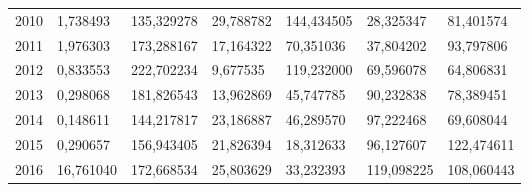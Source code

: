 \begin{table}
\begin{tabular}{p{1cm}p{2cm}p{2cm}p{2cm}p{2cm}p{2cm}p{2cm}}
 2010 &                               1,738493 &        135,329278 &                            29,788782 &                            144,434505 &                    28,325347 &  81,401574 \\
 2011 &                               1,976303 &        173,288167 &                            17,164322 &                             70,351036 &                    37,804202 &  93,797806 \\
 2012 &                               0,833553 &        222,702234 &                             9,677535 &                            119,232000 &                    69,596078 &  64,806831 \\
 2013 &                               0,298068 &        181,826543 &                            13,962869 &                             45,747785 &                    90,232838 &  78,389451 \\
 2014 &                               0,148611 &        144,217817 &                            23,186887 &                             46,289570 &                    97,222468 &  69,608044 \\
 2015 &                               0,290657 &        156,943405 &                            21,826394 &                             18,312633 &                    96,127607 & 122,474611 \\
 2016 &                              16,761040 &        172,668534 &                            25,803629 &                             33,232393 &                   119,098225 & 108,060443 \\
\bottomrule
\end{tabular}
\end{table}
